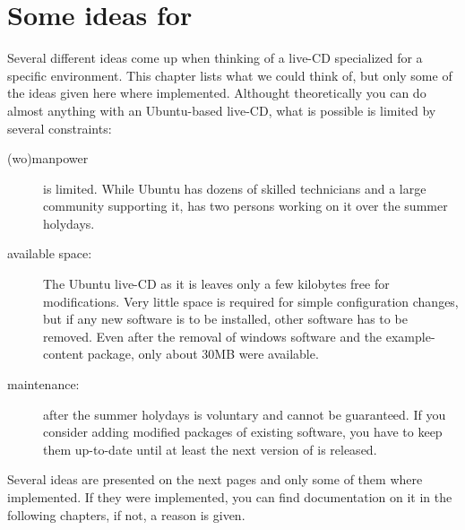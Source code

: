 
\chapter{Some ideas for \tunix}
Several different ideas come up when thinking of a live-CD specialized for a
specific environment. This chapter lists what we could think of, but only some
of the ideas given here where implemented. Althought theoretically you can do
almost anything with an Ubuntu-based live-CD, what is possible is limited by
several constraints:
\begin{description}
 \item[(wo)manpower] is limited. While Ubuntu has dozens of skilled technicians and
   a large community supporting it, \tunix has two persons working on it over
   the summer holydays.
 \item[available space:] The Ubuntu live-CD as it is leaves only a few kilobytes
   free for modifications. Very little space is required for simple
   configuration changes, but if any new software is to be installed, other
   software has to be removed. Even after the removal of windows software and the
   example-content package, only about 30MB were available.
 \item[maintenance:] after the summer holydays is voluntary and cannot be
   guaranteed. If you consider adding modified packages of existing software,
   you have to keep them up-to-date until at least the next version of \tunix is
   released.
\end{description}
Several ideas are presented on the next pages and only some of them where
implemented. If they were implemented, you can find documentation on it in the
following chapters, if not, a reason is given.
